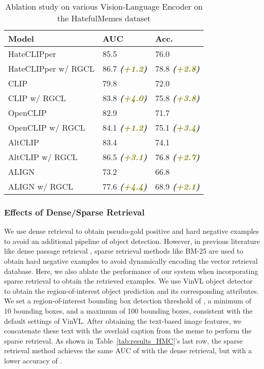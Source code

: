 \documentclass[11pt]{article}
\begin{document}
\begin{table}[htb]
\small
\caption{Ablation study on various Vision-Language Encoder on the HatefulMemes dataset}
\label{tab:ablation_encoder}
\centering
\begin{tabularx}{0.45\textwidth}{Xll}
\toprule
 Model                     & \textbf{AUC} & \textbf{Acc}.  \\ 
\midrule
HateCLIPper & 85.5 &76.0 \\
HateCLIPper w/ RGCL & 86.7 \textbf{\textit{(\textcolor{olive}{+1.2})}} & 78.8 \textbf{\textit{(\textcolor{olive}{+2.8})}} \\
\midrule
CLIP & 79.8 & 72.0\\
CLIP w/ RGCL & 83.8 \textbf{\textit{(\textcolor{olive}{+4.0})}} & 75.8 \textbf{\textit{(\textcolor{olive}{+3.8})}}\\
\midrule
OpenCLIP  & 82.9 & 71.7 \\
OpenCLIP w/ RGCL & 84.1 \textbf{\textit{(\textcolor{olive}{+1.2})}} & 75.1 \textbf{\textit{(\textcolor{olive}{+3.4})}}\\
\midrule
AltCLIP & 83.4 & 74.1\\
AltCLIP w/ RGCL & 86.5 \textbf{\textit{(\textcolor{olive}{+3.1})}} & 76.8 \textbf{\textit{(\textcolor{olive}{+2.7})}}\\
\midrule
ALIGN &  73.2& 66.8  \\
ALIGN w/ RGCL & 77.6 \textbf{\textit{(\textcolor{olive}{+4.4})}} & 68.9 \textbf{\textit{(\textcolor{olive}{+2.1})}} \\
\bottomrule
\end{tabularx}
\end{table}


\subsubsection{Effects of Dense/Sparse Retrieval}
We use dense retrieval to obtain pseudo-gold positive and hard negative examples to avoid an additional pipeline of object detection. However, in previous literature like dense passage retrieval \cite{dpr2020}, sparse retrieval methods like BM-25 \cite{Robertson_BM25_2009} are used to obtain hard negative examples to avoid dynamically encoding the vector retrieval database. Here, we also ablate the performance of our system when incorporating sparse retrieval to obtain the retrieved examples. We use VinVL object detector \cite{vinVL2021} to obtain the region-of-interest object prediction and its corresponding attributes. 
We set a region-of-interest bounding box detection threshold of , a minimum of 10 bounding boxes, and a maximum of 100 bounding boxes, consistent with the default settings of VinVL. After obtaining the text-based image features, we concatenate these text with the overlaid caption from the meme to perform the sparse retrieval. As shown in Table~\ref{tab:results_HMC}'s last row, the sparse retrieval method achieves the same AUC of  with the dense retrieval, but with a lower accuracy of . 
\end{document}
